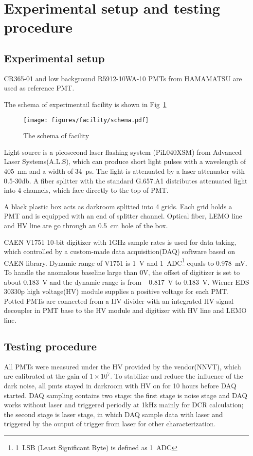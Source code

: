 \section{Experimental setup and testing procedure}
\label{SetUp}
\subsection{Experimental setup}
\label{sec:setup}
CR365-01\cite{BJBS} and low background R5912-10WA-10\cite{JPBS} PMTs from HAMAMATSU are used as reference PMT.

The schema of experimentail facility is shown in Fig~\ref{fig:facility}

\begin{figure}[!htbp]
    \centering
    \texttt{[image: figures/facility/schema.pdf]}
    \caption{The schema of facility}
    \label{fig:facility}
\end{figure}

Light source is a picosecond laser flashing system (PiL040XSM) from Advanced Laser Systems(A.L.S)\cite{NTKLaser}, which can produce short light pulses with a wavelength of \SI{405}{nm} and a width of \SI{34}{ps}. The light is attenuated by a laser attenuator with 0.5-30db. A fiber splitter with the standard G.657.A1 distributes attenuated light into 4 channels, which face directly to the top of PMT.

A black plastic box acts as darkroom splitted into 4 grids. Each grid holds a PMT and is equipped with an end of splitter channel. Optical fiber, LEMO line and HV line are go through an \SI{0.5}{cm} hole of the box.

CAEN V1751 10-bit digitizer with 1GHz sample rates is used for data taking\cite{CAENV1751}, which controlled by a custom-made data acquisition(DAQ) software based on CAEN library. Dynamic range of V1751 is \SI{1}{V} and \SI{1}{ADC}\footnote{\SI{1}{LSB} (Least Significant Byte) is defined as \SI{1}{ADC}} equals to \SI{0.978}{mV}. To handle the anomalous baseline large than 0V, the offset of digitizer is set to about \SI{0.183}{V} and the dynamic range is from \SI{-0.817}{V} to \SI{0.183}{V}. Wiener EDS 30330p high voltage(HV) module\cite{WIENERHV} supplies a positive voltage for each PMT. Potted PMTs are connected from a HV divider with an integrated HV-signal decoupler in PMT base to the HV module and digitizer with HV line and LEMO line.


\subsection{Testing procedure}
All PMTs were measured under the HV provided by the vendor(NNVT), which are calibrated at the gain of $1\times10^7$. To stabilize and reduce the influence of the dark noise, all pmts stayed in darkroom  with HV on for 10 hours before DAQ started. DAQ sampling contains two stage: the first stage is noise stage and DAQ works without laser and triggered periodly at 1kHz mainly for DCR calculation; the second stage is laser stage, in which DAQ sample data with laser and triggered by the output of trigger from laser for other characterization.